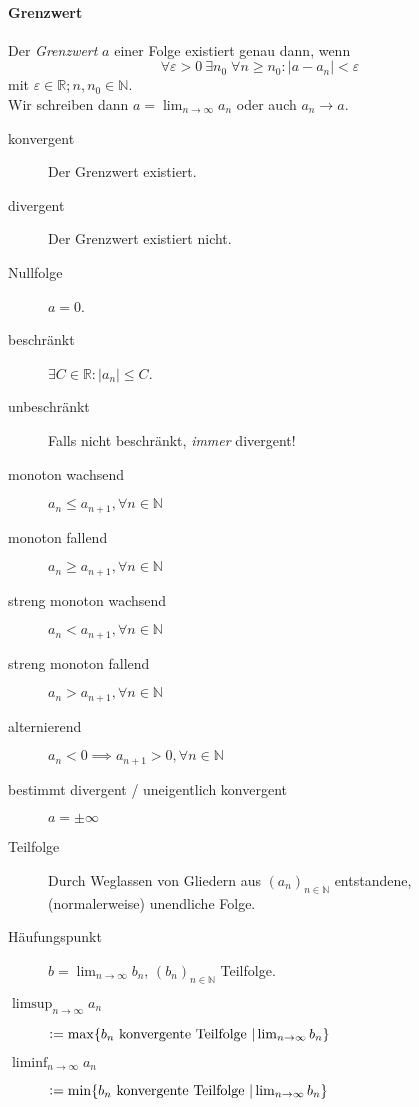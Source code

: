 \documentclass[a4paper, 9pt, DIV=24]{scrartcl}
\newcommand{\N}{\mathbb{N}}
\newcommand{\R}{\mathbb{R}}
\newcommand{\defeq}{\vcentcolon=}
\begin{document}
\paragraph{Grenzwert}Der \emph{Grenzwert} $a$ einer Folge existiert genau dann,
wenn 
\[ \forall \varepsilon > 0 \: \exists n_0 \; \forall n \geq n_0: |a - a_n| < \varepsilon \]
mit $ \varepsilon \in \R; n,n_0 \in\N  $. \\
Wir schreiben dann $a = \lim_{n\to\infty} a_n$ oder auch $a_n \to a$.
\begin{description}
 \item[konvergent] Der Grenzwert existiert.
 \item[divergent] Der Grenzwert existiert nicht.
 \item[Nullfolge] $a = 0$.
 \item[beschränkt] $\exists C\in\R: |a_n| \leq C$.
 \item[unbeschränkt] Falls nicht beschränkt, \emph{immer} divergent!
 \item[monoton wachsend] $a_n \leq a_{n+1}, \forall{n\in\N}$
 \item[monoton fallend] $a_n \geq a_{n+1}, \forall{n\in\N}$
 \item[streng monoton wachsend] $a_n < a_{n+1}, \forall{n\in\N}$
 \item[streng monoton fallend] $a_n > a_{n+1}, \forall{n\in\N}$
 \item[alternierend] $a_n < 0 \implies a_{n+1} > 0, \forall{n\in\N}$
 \item[bestimmt divergent / uneigentlich konvergent] $a = \pm \infty$
 \item[Teilfolge] Durch Weglassen von Gliedern aus $(a_n)_{n\in\N}$ entstandene, (normalerweise) unendliche Folge.
 \item[Häufungspunkt] $b = \lim_{n\to\infty} b_n$, $(b_n)_{n\in\N}$ Teilfolge.
 \item[$\limsup_{n\to\infty}a_n$]$\defeq\max\{b_n\text{ konvergente Teilfolge } | \lim_{n\to\infty} b_n\}$
 \item[$\liminf_{n\to\infty}a_n$]$\defeq\min\{b_n\text{ konvergente Teilfolge } | \lim_{n\to\infty} b_n\}$
\end{description}
\end{document}
